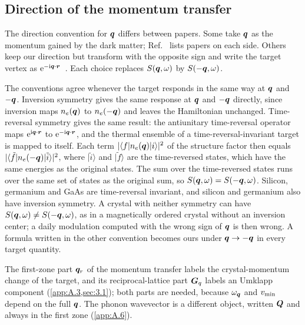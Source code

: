\subsection{Direction of the momentum transfer}

The direction convention for $\bm{q}$ differs between papers. Some take $\bm{q}$ as the momentum gained by the dark matter; Ref.~\cite[below Eq.~(12)]{trickle2022effective} lists papers on each side. Others keep our direction but transform with the opposite sign and write the target vertex as $\mathrm{e}^{-\mathrm{i}\bm{q}\cdot\bm{r}}$~\cite[Eq.~(S.4)]{hochberg2021determining}. Each choice replaces $S(\bm{q},\omega)$ by $S(-\bm{q},\omega)$.

The conventions agree whenever the target responds in the same way at $\bm{q}$ and $-\bm{q}$. Inversion symmetry gives the same response at $\bm{q}$ and $-\bm{q}$ directly, since inversion maps $n_e(\bm{q})$ to $n_e(-\bm{q})$ and leaves the Hamiltonian unchanged. Time-reversal symmetry gives the same result: the antiunitary time-reversal operator maps $\mathrm{e}^{\mathrm{i}\bm{q}\cdot\bm{r}}$ to $\mathrm{e}^{-\mathrm{i}\bm{q}\cdot\bm{r}}$, and the thermal ensemble of a time-reversal-invariant target is mapped to itself. Each term $|\langle f|n_e(\bm{q})|i\rangle|^2$ of the structure factor then equals $|\langle \tilde f|n_e(-\bm{q})|\tilde i\rangle|^2$, where $|\tilde i\rangle$ and $|\tilde f\rangle$ are the time-reversed states, which have the same energies as the original states. The sum over the time-reversed states runs over the same set of states as the original sum, so $S(\bm{q},\omega) = S(-\bm{q},\omega)$. Silicon, germanium and GaAs are time-reversal invariant, and silicon and germanium also have inversion symmetry. A crystal with neither symmetry can have $S(\bm{q},\omega) \neq S(-\bm{q},\omega)$, as in a magnetically ordered crystal without an inversion center; a daily modulation computed with the wrong sign of $\bm{q}$ is then wrong. A formula written in the other convention becomes ours under $\bm{q} \to -\bm{q}$ in every target quantity.

The first-zone part $\bm{q}_r$ of the momentum transfer labels the crystal-momentum change of the target, and its reciprocal-lattice part $\bm{G}_q$ labels an Umklapp component (\cref{app:A.3,sec:3.1}); both parts are needed, because $\omega_{\bm{q}}$ and $v_{\mathrm{min}}$ depend on the full $\bm{q}$. The phonon wavevector is a different object, written $\bm{Q}$ and always in the first zone (\cref{app:A.6}).
